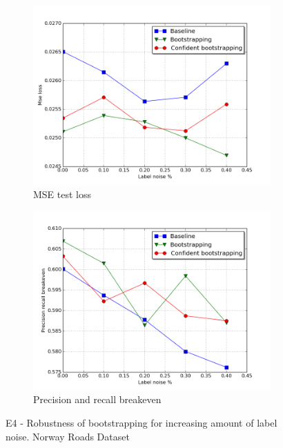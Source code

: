 \begin{figure}[!ht]
\begin{subfigure}{0.48\textwidth}
\includegraphics[width=\linewidth]{figs/E5/E5_lc_noise.png}
\caption{MSE test loss} \label{fig:E5_boot_norway_loss}
\end{subfigure}
\hspace*{\fill} %
\begin{subfigure}{0.48\textwidth}
\includegraphics[width=\linewidth]{figs/E5/E5_pr_noise.png}
\caption{Precision and recall breakeven} \label{fig:E5_boot_norway_pr}
\end{subfigure}
\hspace*{\fill} %
\caption{E4 - Robustness of bootstrapping for increasing amount of label noise. Norway Roads Dataset} \label{fig:E5_boot_norway}
\end{figure}

